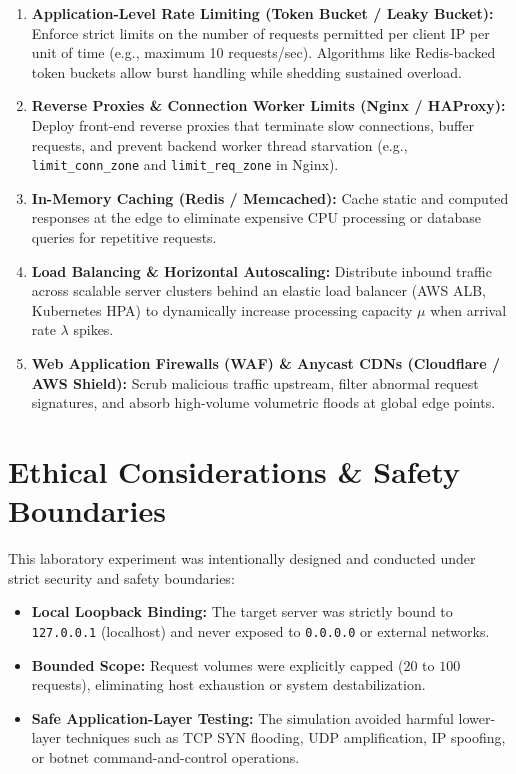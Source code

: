 \documentclass[11pt,a4paper]{article}
\begin{document}
\begin{enumerate}[leftmargin=*]
    \item \textbf{Application-Level Rate Limiting (Token Bucket / Leaky Bucket):} Enforce strict limits on the number of requests permitted per client IP per unit of time (e.g., maximum 10 requests/sec). Algorithms like Redis-backed token buckets allow burst handling while shedding sustained overload.
    \item \textbf{Reverse Proxies \& Connection Worker Limits (Nginx / HAProxy):} Deploy front-end reverse proxies that terminate slow connections, buffer requests, and prevent backend worker thread starvation (e.g., \texttt{limit\_conn\_zone} and \texttt{limit\_req\_zone} in Nginx).
    \item \textbf{In-Memory Caching (Redis / Memcached):} Cache static and computed responses at the edge to eliminate expensive CPU processing or database queries for repetitive requests.
    \item \textbf{Load Balancing \& Horizontal Autoscaling:} Distribute inbound traffic across scalable server clusters behind an elastic load balancer (AWS ALB, Kubernetes HPA) to dynamically increase processing capacity $\mu$ when arrival rate $\lambda$ spikes.
    \item \textbf{Web Application Firewalls (WAF) \& Anycast CDNs (Cloudflare / AWS Shield):} Scrub malicious traffic upstream, filter abnormal request signatures, and absorb high-volume volumetric floods at global edge points.
\end{enumerate}

\section{Ethical Considerations \& Safety Boundaries}
This laboratory experiment was intentionally designed and conducted under strict security and safety boundaries:
\begin{itemize}[leftmargin=*]
    \item \textbf{Local Loopback Binding:} The target server was strictly bound to \texttt{127.0.0.1} (localhost) and never exposed to \texttt{0.0.0.0} or external networks.
    \item \textbf{Bounded Scope:} Request volumes were explicitly capped ($20$ to $100$ requests), eliminating host exhaustion or system destabilization.
    \item \textbf{Safe Application-Layer Testing:} The simulation avoided harmful lower-layer techniques such as TCP SYN flooding, UDP amplification, IP spoofing, or botnet command-and-control operations.
\end{itemize}
\end{document}
